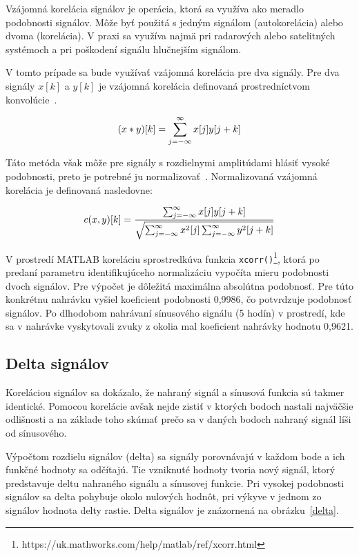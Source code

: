 Vzájomná korelácia signálov je operácia, ktorá sa využíva ako meradlo podobnosti signálov. Môže byť použitá s jedným signálom (autokorelácia) alebo dvoma (korelácia). V praxi sa využíva najmä pri radarových alebo satelitných systémoch a pri poškodení signálu hlučnejším signálom.

V tomto prípade sa bude využívať vzájomná korelácia pre dva signály. Pre dva signály $x[k]$ a $y[k]$ je vzájomná korelácia definovaná prostredníctvom konvolúcie~\cite{Bracewell}.

\begin{equation}
	(x * y)[k] = \sum_{j=-{\infty}}^{\infty} x[j]y[j+k] \\
	\label{eq:eq1}
\end{equation}

Táto metóda však môže pre signály s rozdielnymi amplitúdami hlásiť vysoké podobnosti, preto je potrebné ju normalizovať~\cite{Bracewell}. Normalizovaná vzájomná korelácia je definovaná nasledovne:

\begin{equation}
	c(x, y)[k] = \frac{\sum_{j=-{\infty}}^{\infty} x[j]y[j+k]}{\sqrt{\sum_{j=-{\infty}}^{\infty} x^2[j]\sum_{j=-{\infty}}^{\infty} y^2[j+k]}} \\
	\label{eq:eq2}
\end{equation}

V prostredí MATLAB koreláciu sprostredkúva funkcia \texttt{xcorr()}\footnote{https://uk.mathworks.com/help/matlab/ref/xcorr.html}, ktorá po predaní parametru identifikujúceho normalizáciu vypočíta mieru podobnosti dvoch signálov. Pre výpočet je dôležitá maximálna absolútna podobnosť. Pre túto konkrétnu nahrávku vyšiel koeficient podobnosti 0,9986, čo potvrdzuje podobnosť signálov. Po dlhodobom nahrávaní sínusového signálu (5 hodín) v prostredí, kde sa v nahrávke vyskytovali zvuky z okolia mal koeficient nahrávky hodnotu 0,9621.

\subsection*{Delta signálov}

Koreláciou signálov sa dokázalo, že nahraný signál a sínusová funkcia sú takmer identické. Pomocou korelácie avšak nejde zistiť v ktorých bodoch nastali najväčšie odlišnosti a na základe toho skúmať prečo sa v daných bodoch nahraný signál líši od sínusového. 

Výpočtom rozdielu signálov (delta) sa signály porovnávajú v každom bode a ich funkčné hodnoty sa odčítajú. Tie vzniknuté hodnoty tvoria nový signál, ktorý predstavuje deltu nahraného signálu a sínusovej funkcie. Pri vysokej podobnosti signálov sa delta pohybuje okolo nulových hodnôt, pri výkyve v jednom zo signálov hodnota delty rastie. Delta signálov je znázornená na obrázku~\ref{delta}. 

